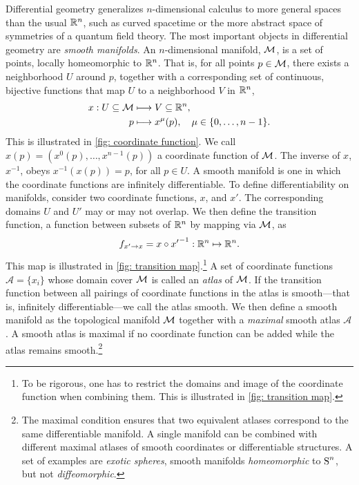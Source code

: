 Differential geometry generalizes $n$-dimensional calculus to more general spaces than the usual $\mathbb R^n$, such as curved spacetime or the more abstract space of symmetries of a quantum field theory.
The most important objects in differential geometry are \emph{smooth manifolds}.
An $n$-dimensional manifold, $\mathcal M$, is a set of points, locally homeomorphic to $\mathbb R^n$.
That is, for all points $p \in \mathcal M$, there exists a neighborhood $U$ around $p$, together with a corresponding set of continuous, bijective functions that map $U$ to a neighborhood $V$ in $\mathbb R^n$,
%
\begin{align}
    x: U \subseteq \mathcal M & \longmapsto V \subseteq \mathbb R^n, \\
    p & \longmapsto x^\mu(p), \quad \mu \in \{0, \dots, n-1\}.
\end{align}
%
This is illustrated in \autoref{fig: coordinate function}.
We call $x(p) = (x^0(p), \dots, x^{n- 1}(p))$ a coordinate function of $\mathcal M$.
The inverse of $x$, $x^{-1}$, obeys $x^{-1}(x(p)) = p$, for all $p \in U$.
A smooth manifold is one in which the coordinate functions are infinitely differentiable.
To define differentiability on manifolds, consider two coordinate functions, $x$, and $x'$.
The corresponding domains $U$ and $U'$ may or may not overlap.
We then define the transition function, a function between subsets of $\mathbb R^n$ by mapping via $\mathcal M$, as
%
\begin{align}
    f_{x'\rightarrow x} = x \circ {x'}^{-1} : \mathbb R^n \mapsto \mathbb R^n.
\end{align}
%
This map is illustrated in \autoref{fig: transition map}.\footnote{
    To be rigorous, one has to restrict the domains and image of the coordinate function when combining them. This is illustrated in \autoref{fig: transition map}.
    }
A set of coordinate functions $\mathcal A = \{x_i\}$ whose domain cover $\mathcal M$ is called an \emph{atlas} of $\mathcal M$.
If the transition function between all pairings of coordinate functions in the atlas is smooth---that is, infinitely differentiable---we call the atlas smooth.
We then define a smooth manifold as the topological manifold $\mathcal M$ together with a \emph{maximal} smooth atlas $\mathcal A$.
A smooth atlas is maximal if no coordinate function can be added while the atlas remains smooth.\footnote{
    The maximal condition ensures that two equivalent atlases correspond to the same differentiable manifold. A single manifold can be combined with different maximal atlases of smooth coordinates or differentiable structures. A set of examples are \emph{exotic spheres}, smooth manifolds \emph{homeomorphic} to $\text S^n$, but not \emph{diffeomorphic}. 
    }
